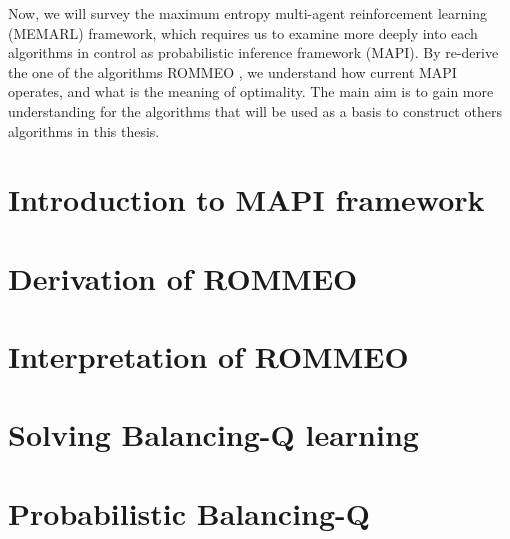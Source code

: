 \label{chapter:chap3}

\begin{miniabstract}
Now, we will survey the maximum entropy multi-agent reinforcement learning (MEMARL) framework, which requires us to examine more deeply into each algorithms in control as probabilistic inference framework (MAPI). By re-derive the one of the algorithms ROMMEO \cite{tian2019regularized}, we understand how current MAPI operates, and what is the meaning of optimality. The main aim is to gain more understanding for the algorithms that will be used as a basis to construct others algorithms in this thesis.
\end{miniabstract}


\section{Introduction to MAPI framework}


\section{Derivation of ROMMEO}


\section{Interpretation of ROMMEO}


\section{Solving Balancing-Q learning}


\section{Probabilistic Balancing-Q}
